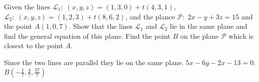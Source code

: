 
\begin{Exercise}[
name={},
title={}, 
difficulty=0,
origin={\cite{BS}}]
Given the lines $\mathcal{L}_1:\; (x, y, z) = (1, 3, 0) + t(4, 3, 1)$, $\mathcal{L}_2:\; (x, y, z) = (1, 2, 3) + t(8, 6, 2)$, and the plance $\mathcal{P}:\; 2x-y+3z=15$ and the point $A(1, 0, 7)$.
\Question Show that the lines $\mathcal{L}_1$ and $\mathcal{L}_2$ lie in the same plane and find the general equation of this plane.
\Question Find the point $B$ on the plane $\mathcal{P}$ which is closest to the point $A$.

\end{Exercise}
\begin{Answer}
\Question Since the two lines are parallel they lie on the same plane. $5x-6y-2x-13=0$.
\Question $B(-\frac{1}{7}, \frac{4}{7}, \frac{37}{7})$
\end{Answer}
